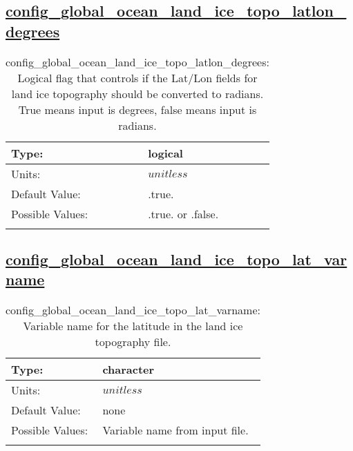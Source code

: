 \subsection[config\_global\_ocean\_land\_ice\_topo\_latlon\_degrees]{\hyperref[sec:nm_tab_global_ocean]{config\_global\_ocean\_land\_ice\_topo\_latlon\_degrees}}
\label{subsec:nm_sec_config_global_ocean_land_ice_topo_latlon_degrees}
\begin{center}
\begin{longtable}{| p{2.0in} || p{4.0in} |}
    \hline
    Type: & logical \\
    \hline
    Units: & $unitless$ \\
    \hline
    Default Value: & .true. \\
    \hline
    Possible Values: & .true. or .false. \\
    \hline
    \caption{config\_global\_ocean\_land\_ice\_topo\_latlon\_degrees: Logical flag that controls if the Lat/Lon fields for land ice topography should be converted to radians. True means input is degrees, false means input is radians.}
\end{longtable}
\end{center}
\subsection[config\_global\_ocean\_land\_ice\_topo\_lat\_varname]{\hyperref[sec:nm_tab_global_ocean]{config\_global\_ocean\_land\_ice\_topo\_lat\_varname}}
\label{subsec:nm_sec_config_global_ocean_land_ice_topo_lat_varname}
\begin{center}
\begin{longtable}{| p{2.0in} || p{4.0in} |}
    \hline
    Type: & character \\
    \hline
    Units: & $unitless$ \\
    \hline
    Default Value: & none \\
    \hline
    Possible Values: & Variable name from input file. \\
    \hline
    \caption{config\_global\_ocean\_land\_ice\_topo\_lat\_varname: Variable name for the latitude in the land ice topography file.}
\end{longtable}
\end{center}
